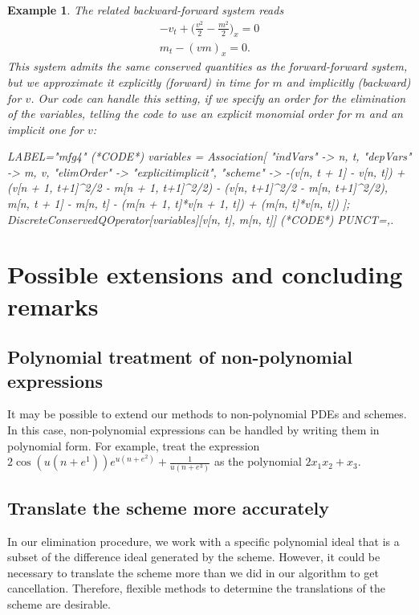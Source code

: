 \documentclass[sigconf,twocolumn]{acmart}
\newcommand{\1}{{\chi}}
\numberwithin{equation}{section}
\theoremstyle{thmlemcorr}
\numberwithin{theorem}{section}
\theoremstyle{thmlemcorr*}
\theoremstyle{defi}
\theoremstyle{remexample}
\newtheorem{example}[theorem]{Example}
\theoremstyle{ass}
\begin{document}
\begin{example}
	The related backward-forward system reads
	\begin{gather*}
		-v_t+\Big(\frac{v^2}{2}-\frac{m^2}{2}\Big)_x=0\\
		m_t-(vm)_x=0.
	\end{gather*}
	This system admits the same conserved quantities as the forward-forward system, but we approximate it explicitly (forward) in time for $m$ and implicitly (backward) for $v$. Our code can handle this setting, if we specify an order for the elimination of the variables, telling the code to use an explicit monomial order for $m$ and an implicit one for $v$:
	\begin{EXE}
		LABEL="mfg4"
		(*CODE*)
		variables = Association[
		"indVars" -> {n, t},
		"depVars" -> {m, v},
		"elimOrder" -> "explicitimplicit",
		"scheme" -> {-(v[n, t + 1] - 
			v[n, t]) + (v[n + 1, t+1]^2/2 - m[n + 1, t+1]^2/2) - (v[n, t+1]^2/2 - 
			m[n, t+1]^2/2), 
			m[n, t + 1] - 
			m[n, t] - (m[n + 1, t]*v[n + 1, t]) + (m[n, t]*v[n, t])}
		];
		DiscreteConservedQOperator[variables][{v[n, t], m[n, t]}]
		(*CODE*)
		PUNCT={,.}
	\end{EXE}
	\begin{small}
		
		
	\end{small}
\end{example}
\section{Possible extensions and concluding remarks}
\subsection*{Polynomial treatment of non-polynomial expressions}
It may be possible to extend our methods to non-polynomial PDEs and schemes. In this case, non-polynomial expressions can be handled by writing them in polynomial form. For example, treat the expression $2\cos(u(n+e^1))e^{u(n+e^2)}+\frac{1}{u(n+e^3)}$
as the polynomial $2x_1x_2+x_3$.
\subsection*{Translate the scheme more accurately}
In our elimination procedure, we work with a specific polynomial ideal that is a subset of the difference ideal generated by the scheme. However, it could be necessary to translate the scheme more than we did in our algorithm to get cancellation. Therefore, flexible methods to determine the translations of the scheme are desirable.
\end{document}
